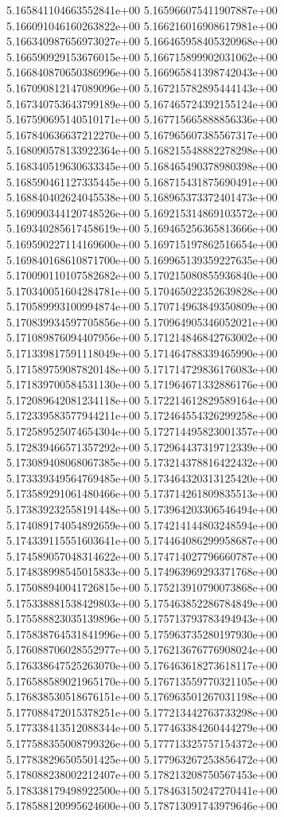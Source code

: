 5.165841104663552841e+00
5.165966075411907887e+00
5.166091046160263822e+00
5.166216016908617981e+00
5.166340987656973027e+00
5.166465958405320968e+00
5.166590929153676015e+00
5.166715899902031062e+00
5.166840870650386996e+00
5.166965841398742043e+00
5.167090812147089096e+00
5.167215782895444143e+00
5.167340753643799189e+00
5.167465724392155124e+00
5.167590695140510171e+00
5.167715665888856336e+00
5.167840636637212270e+00
5.167965607385567317e+00
5.168090578133922364e+00
5.168215548882278298e+00
5.168340519630633345e+00
5.168465490378980398e+00
5.168590461127335445e+00
5.168715431875690491e+00
5.168840402624045538e+00
5.168965373372401473e+00
5.169090344120748526e+00
5.169215314869103572e+00
5.169340285617458619e+00
5.169465256365813666e+00
5.169590227114169600e+00
5.169715197862516654e+00
5.169840168610871700e+00
5.169965139359227635e+00
5.170090110107582682e+00
5.170215080855936840e+00
5.170340051604284781e+00
5.170465022352639828e+00
5.170589993100994874e+00
5.170714963849350809e+00
5.170839934597705856e+00
5.170964905346052021e+00
5.171089876094407956e+00
5.171214846842763002e+00
5.171339817591118049e+00
5.171464788339465990e+00
5.171589759087820148e+00
5.171714729836176083e+00
5.171839700584531130e+00
5.171964671332886176e+00
5.172089642081234118e+00
5.172214612829589164e+00
5.172339583577944211e+00
5.172464554326299258e+00
5.172589525074654304e+00
5.172714495823001357e+00
5.172839466571357292e+00
5.172964437319712339e+00
5.173089408068067385e+00
5.173214378816422432e+00
5.173339349564769485e+00
5.173464320313125420e+00
5.173589291061480466e+00
5.173714261809835513e+00
5.173839232558191448e+00
5.173964203306546494e+00
5.174089174054892659e+00
5.174214144803248594e+00
5.174339115551603641e+00
5.174464086299958687e+00
5.174589057048314622e+00
5.174714027796660787e+00
5.174838998545015833e+00
5.174963969293371768e+00
5.175088940041726815e+00
5.175213910790073868e+00
5.175338881538429803e+00
5.175463852286784849e+00
5.175588823035139896e+00
5.175713793783494943e+00
5.175838764531841996e+00
5.175963735280197930e+00
5.176088706028552977e+00
5.176213676776908024e+00
5.176338647525263070e+00
5.176463618273618117e+00
5.176588589021965170e+00
5.176713559770321105e+00
5.176838530518676151e+00
5.176963501267031198e+00
5.177088472015378251e+00
5.177213442763733298e+00
5.177338413512088344e+00
5.177463384260444279e+00
5.177588355008799326e+00
5.177713325757154372e+00
5.177838296505501425e+00
5.177963267253856472e+00
5.178088238002212407e+00
5.178213208750567453e+00
5.178338179498922500e+00
5.178463150247270441e+00
5.178588120995624600e+00
5.178713091743979646e+00
